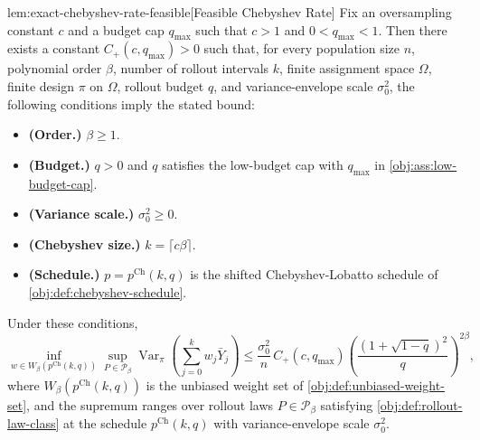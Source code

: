 \begin{propositionv}{lem:exact-chebyshev-rate-feasible}[Feasible Chebyshev Rate]
Fix an oversampling constant \(c\) and a budget cap \(q_{\max}\) such that \(c>1\) and \(0<q_{\max}<1\). Then there exists a constant \(C_+(c,q_{\max})>0\) such that, for every population size \(n\), polynomial order \(\beta\), number of rollout intervals \(k\), finite assignment space \(\Omega\), finite design \(\pi\) on \(\Omega\), rollout budget \(q\), and variance-envelope scale \(\sigma_0^2\), the following conditions imply the stated bound:
\begin{itemize}
\item \textbf{(Order.)} \(\beta\ge 1\).
\item \textbf{(Budget.)} \(q>0\) and \(q\) satisfies the low-budget cap with \(q_{\max}\) in \cref{obj:ass:low-budget-cap}.
\item \textbf{(Variance scale.)} \(\sigma_0^2\ge 0\).
\item \textbf{(Chebyshev size.)} \(k=\lceil c\beta\rceil\).
\item \textbf{(Schedule.)} \(p=p^{\mathrm{Ch}}(k,q)\) is the shifted Chebyshev-Lobatto schedule of \cref{obj:def:chebyshev-schedule}.
\end{itemize}
Under these conditions,
\[
\inf_{w\in W_\beta(p^{\mathrm{Ch}}(k,q))}
\sup_{P\in\mathcal P_\beta}
\operatorname{Var}_\pi\!\left(\sum_{j=0}^k w_j\bar Y_j\right)
\le
\frac{\sigma_0^2}{n}\,
C_+(c,q_{\max})
\left(\frac{(1+\sqrt{1-q})^2}{q}\right)^{2\beta},
\]
where \(W_\beta(p^{\mathrm{Ch}}(k,q))\) is the unbiased weight set of \cref{obj:def:unbiased-weight-set}, and the supremum ranges over rollout laws \(P\in\mathcal P_\beta\) satisfying \cref{obj:def:rollout-law-class} at the schedule \(p^{\mathrm{Ch}}(k,q)\) with variance-envelope scale \(\sigma_0^2\).
\end{propositionv}
